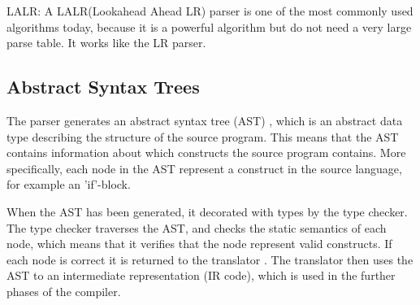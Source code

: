 LALR:
A LALR(Lookahead Ahead LR) parser is one of the most commonly used algorithms today, because it is a powerful algorithm but do not need a very large parse table. It works like the LR parser.

\subsection*{Abstract Syntax Trees}
The parser generates an abstract syntax tree (AST) \citep{CraftingACompiler}, which is an abstract data type describing the structure of the source program. This means that the AST contains information about which constructs the source program contains. More specifically, each node in the AST represent a construct in the source language, for example an 'if'-block.

When the AST has been generated, it decorated with types by the type checker. The type checker traverses the AST, and checks the static semantics of each node, which means that it verifies that the node represent valid constructs. If each node is correct it is returned to the translator \citep{CraftingACompiler}. The translator then uses the AST to an intermediate representation (IR code), which is used in the further phases of the compiler.